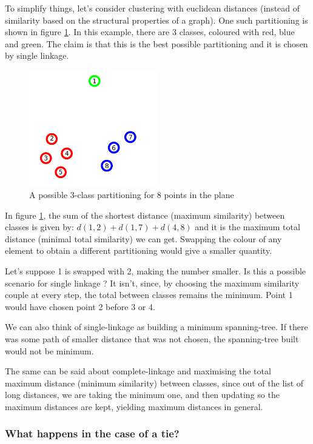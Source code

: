 \documentclass[12pt,a4paper]{article}
\begin{document}
To simplify things, let's consider clustering with euclidean distances
(instead of similarity based on the structural properties of a
graph). One such partitioning is shown in figure \ref{fig:simple}. In
this example, there are 3 classes, coloured with red, blue and
green. The claim is that this is the best possible partitioning and it
is chosen by single linkage.

\begin{figure}[ht!]
  \centering
  \includegraphics[width=0.5\textwidth]{img/simple.png}
  \caption{A possible 3-class partitioning for 8 points in the plane}
  \label{fig:simple}
\end{figure}

In figure \ref{fig:simple}, the sum of the shortest distance (maximum
similarity) between classes is given by: $d(1,2) + d(1, 7) + d(4,8)$
and it is the maximum total distance (minimal total similarity) we can
get. Swapping the colour of any element to obtain a different
partitioning would give a smaller quantity.

Let's suppose 1 is swapped with 2, making the number smaller. Is this
a possible scenario for single linkage ? It isn't, since, by choosing
the maximum similarity couple at every step, the total between classes
remains the minimum. Point 1 would have chosen point 2 before 3 or 4.

We can also think of single-linkage as building a minimum
spanning-tree. If there was some path of smaller distance that was not
chosen, the spanning-tree built would not be minimum.

The same can be said about complete-linkage and maximising the total
maximum distance (minimum similarity) between classes, since out of
the list of long distances, we are taking the minimum one, and then
updating so the maximum distances are kept, yielding maximum distances
in general.


\subsubsection{What happens in the case of a tie?}
\end{document}
